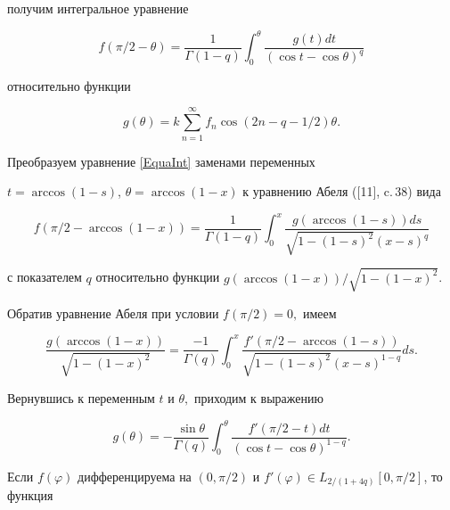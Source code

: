 получим интегральное уравнение


\begin{equation}\label{EquaInt}


f(\pi/2-\theta)= \frac{1}{\Gamma(1-q)}


\int_0^\theta \frac{g(t)dt}{(\cos t -\cos\theta)^{q}}


\end{equation}


относительно функции


\begin{equation}\label{G}


g(\theta) = k \sum_{n=1}^\infty f_n \cos(2n-q-1/2)\theta.


\end{equation}


Преобразуем уравнение \eqref{EquaInt} заменами переменных


$t=\arccos(1-s)$, $\theta=\arccos(1-x)$ к уравнению Абеля ([11], c.\,38) вида


$$


f(\pi/2 -\arccos(1-x)) = \frac{1}{\Gamma(1-q)} \int_0^x


\frac{g(\arccos(1-s)) ds}{\sqrt{1-(1-s)^2} (x-s)^q}


$$


с показателем $q$ относительно функции $g(\arccos(1-x))/\sqrt{1-(1-x)^2}$.


Обратив уравнение Абеля при условии $f(\pi/2)=0,$ имеем


$$


\frac{g(\arccos(1-x))}{\sqrt{1-(1-x)^2}} = \frac{-1}{\Gamma(q)}


\int_0^x \frac{f'(\pi/2-\arccos(1-s))}{\sqrt{1-(1-s)^2} (x-s)^{1-q}} ds.


$$


Вернувшись к переменным $t$ и $\theta,$ приходим к выражению


\begin{equation}\label{GSolve}


g(\theta) = - \frac{\sin \theta}{\Gamma(q)} \int_0^\theta


\frac{f'(\pi/2-t)dt}{(\cos t - \cos \theta)^{1-q}}.


\end{equation}





Если $f(\varphi)$ дифференцируема на $(0,\pi/2)$ и $f'(\varphi)\in


L_{2/(1+4q)}[0,\pi/2]$, то функция



